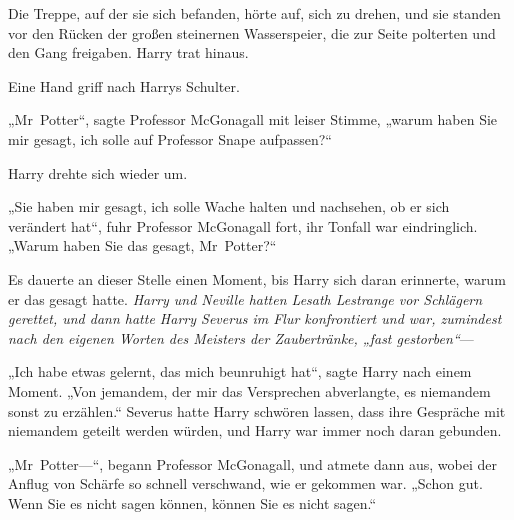 Die Treppe, auf der sie sich befanden, hörte auf, sich zu drehen, und sie standen vor den Rücken der großen steinernen Wasserspeier, die zur Seite polterten und den Gang freigaben. Harry trat hinaus.

Eine Hand griff nach Harrys Schulter.

„Mr~Potter“, sagte Professor McGonagall mit leiser Stimme, „warum haben Sie mir gesagt, ich solle auf Professor Snape aufpassen?“

Harry drehte sich wieder um.

„Sie haben mir gesagt, ich solle Wache halten und nachsehen, ob er sich verändert hat“, fuhr Professor McGonagall fort, ihr Tonfall war eindringlich. „Warum haben Sie das gesagt, Mr~Potter?“

Es dauerte an dieser Stelle einen Moment, bis Harry sich daran erinnerte, warum er das gesagt hatte. \emph{Harry und Neville hatten Lesath Lestrange vor Schlägern gerettet, und dann hatte Harry Severus im Flur konfrontiert und war, zumindest nach den eigenen Worten des Meisters der Zaubertränke, „fast gestorben“}—

„Ich habe etwas gelernt, das mich beunruhigt hat“, sagte Harry nach einem Moment. „Von jemandem, der mir das Versprechen abverlangte, es niemandem sonst zu erzählen.“
Severus hatte Harry schwören lassen, dass ihre Gespräche mit niemandem geteilt werden würden, und Harry war immer noch daran gebunden.

„Mr~Potter—“, begann Professor McGonagall, und atmete dann aus, wobei der Anflug von Schärfe so schnell verschwand, wie er gekommen war. „Schon gut. Wenn Sie es nicht sagen können, können Sie es nicht sagen.“

